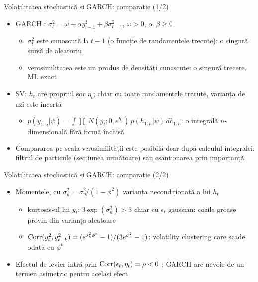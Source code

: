 \begin{frame}{Volatilitatea stochastică și GARCH: comparație (1/2)}
\itemsize{\small}
\begin{itemize}
    \item GARCH : $\sigma^2_t = \omega + \alpha y^2_{t-1} + \beta\sigma^2_{t-1}$, $\omega > 0$, $\alpha, \beta \ge 0$
    \begin{itemize}
        \item $\sigma^2_t$ este cunoscută la $t-1$ (o funcție de randamentele trecute): o singură sursă de aleatoriu
        \item verosimilitatea este un produs de densități cunoscute: o singură trecere, ML exact
    \end{itemize}
    \item SV: $h_t$ are propriul șoc $\eta_t$; chiar cu toate randamentele trecute, varianța de azi este incertă
    \begin{itemize}
        \item $p(y_{1:n} | \psi) = \int\prod_t N(y_t; 0, e^{h_t})\,p(h_{1:n} | \psi)\,dh_{1:n}$: o integrală $n$-dimensională fără formă închisă
    \end{itemize}
    \item Compararea pe scala verosimilității este posibilă doar după calculul integralei: filtrul de particule (secțiunea următoare) sau eșantionarea prin importanță 
\end{itemize}
\end{frame}

\begin{frame}{Volatilitatea stochastică și GARCH: comparație (2/2)}
\itemsize{\small}
\begin{itemize}
    \item Momentele, cu $\sigma^2_h = \sigma^2_\eta/(1 - \phi^2)$ varianța necondiționată a lui $h_t$
    \begin{itemize}
        \item kurtosis-ul lui $y_t$: $3\exp(\sigma^2_h) > 3$ chiar cu $\epsilon_t$ gaussian: cozile groase provin din varianța aleatoare
        \item $\text{Corr}(y^2_t, y^2_{t-k}) = (e^{\sigma^2_h\phi^k} - 1)/(3e^{\sigma^2_h} - 1)$: volatility clustering care scade odată cu $\phi^k$
    \end{itemize}
    \item Efectul de levier intră prin $\text{Corr}(\epsilon_t, \eta_t) = \rho < 0$ ; GARCH are nevoie de un termen asimetric pentru același efect
\end{itemize}
\end{frame}

